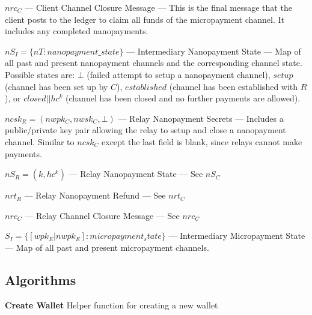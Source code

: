 $nrc_C$ --- Client Channel Closure Message --- This is the final message that the client posts to the ledger to claim all funds of the micropayment channel.
It includes any completed nanopayments.

$nS_I = \{nT: nanopayment\_state\}$ --- Intermediary Nanopayment State --- Map of all past and present nanopayment channels and the corresponding channel state.
Possible states are: $\bot$ (failed attempt to setup a nanopayment channel), $setup$ (channel has been set up by $C$), $established$ (channel has been established with $R$), or $closed||hc^k$ (channel has been closed and no further payments are allowed).

$ncsk_R = (nwpk_C, nwsk_C, \bot)$ --- Relay Nanopayment Secrets --- Includes a public/private key pair allowing the relay to setup and close a nanopayment channel.
Similar to $ncsk_C$ except the last field is blank, since relays cannot make payments.

$nS_R = (k, hc^k)$ --- Relay Nanopayment State --- See $nS_C$

$nrt_R$ --- Relay Nanopayment Refund --- See $nrt_C$

$nrc_C$ --- Relay Channel Closure Message --- See $nrc_C$

$S_I = \{ [wpk_E | nwpk_E] : micropayment_state\}$ --- Intermediary Micropayment State --- Map of all past and present micropayment channels.

\subsection{Algorithms}
\begin{algorithm}
  \caption[Create Wallet]{\textbf{Create Wallet} Helper function for creating a new wallet}
  \begin{algorithmic}[1]
    \EndFunction{}
  \end{algorithmic}
\end{algorithm}

